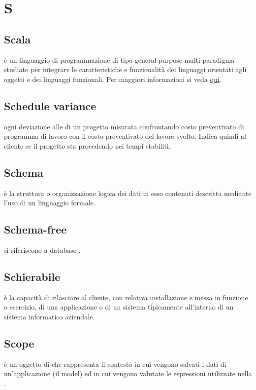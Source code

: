 \documentclass[12pt,a4paper]{article}
\begin{document}
\newpage

\section{S}


\subsection{Scala} 
è un linguaggio di programmazione di tipo general-purpose multi-paradigma studiato per integrare le caratteristiche e funzionalità dei linguaggi orientati agli oggetti e dei linguaggi funzionali. Per maggiori informazioni si veda \href{https://it.wikipedia.org/wiki/Scala_(linguaggio_di_programmazione)}{qui}.

\subsection{Schedule variance} 
ogni deviazione alle  di un progetto misurata confrontando costo preventivato di programma di lavoro con il costo preventivato del lavoro svolto. Indica quindi al cliente se il progetto sta procedendo nei tempi stabiliti.

\subsection{Schema} 
è la struttura o organizzazione logica dei dati in esso contenuti descritta mediante l'uso di un linguaggio formale.

\subsection{Schema-free} 
si riferiscono a database .

\subsection{Schierabile} 
è la capacità di rilasciare al cliente, con relativa installazione e messa in funzione o esercizio, di una applicazione o di un sistema  tipicamente all'interno di un sistema informatico aziendale.

\subsection{Scope}
è un oggetto di  che rappresenta il contesto in cui vengono salvati i dati di un’applicazione (il model) ed in cui vengono valutate le espressioni utilizzate nella .
\end{document}
